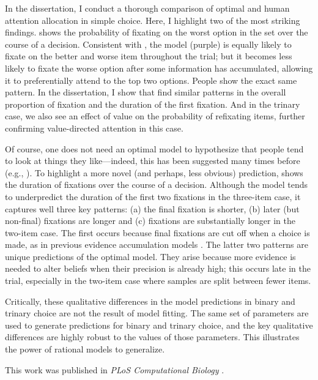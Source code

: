 \documentclass[11pt,a4paperpaper,]{article}
\begin{document}
In the dissertation, I conduct a thorough comparison of optimal and human attention allocation in simple choice. Here, I highlight two of the most striking findings.  shows the probability of fixating on the worst option in the set over the course of a decision. Consistent with , the model (purple) is equally likely to fixate on the better and worse item throughout the trial; but it becomes less likely to fixate the worse option after some information has accumulated, allowing it to preferentially attend to the top two options. People show the exact same pattern. In the dissertation, I show that find similar patterns in the overall proportion of fixation and the duration of the first fixation. And in the trinary case, we also see an effect of value on the probability of refixating items, further confirming value-directed attention in this case.

Of course, one does not need an optimal model to hypothesize that people tend to look at things they like---indeed, this has been suggested many times before (e.g., \citealp{shimojo2003gaze,gluth2020valuebased,anderson2016attention}). To highlight a more novel (and perhaps, less obvious) prediction,  shows the duration of fixations over the course of a decision. Although the model tends to underpredict the duration of the first two fixations in the three-item case, it captures well three key patterns: (a) the final fixation is shorter, (b) later (but non-final) fixations are longer and (c) fixations are substantially longer in the two-item case. The first occurs because final fixations are cut off when a choice is made, as in previous evidence accumulation models \citep{krajbich2010visual}. The latter two patterns are unique predictions of the optimal model. They arise because more evidence is needed to alter beliefs when their precision is already high; this occurs late in the trial, especially in the two-item case where samples are split between fewer items.

Critically, these qualitative differences in the model predictions in binary and trinary choice are not the result of model fitting. The same set of parameters are used to generate predictions for binary and trinary choice, and the key qualitative differences are highly robust to the values of those parameters. This illustrates the power of rational models to generalize.

This work was published in \emph{PLoS Computational Biology} \citep{callaway2021fixation}.
\end{document}
